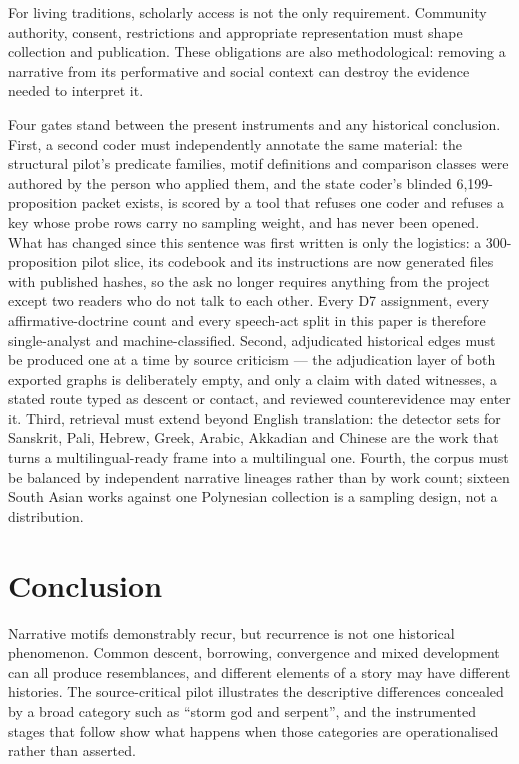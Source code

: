 \documentclass[11pt]{article}
\DeclareRobustCommand{\_}{\textunderscore\allowbreak}
\begin{document}
For living traditions, scholarly access is not the only requirement. Community
authority, consent, restrictions and appropriate representation must shape
collection and publication. These obligations are also methodological: removing a
narrative from its performative and social context can destroy the evidence needed
to interpret it.

Four gates stand between the present instruments and any historical conclusion.
First, a second coder must independently annotate the same material: the
structural pilot's predicate families, motif definitions and comparison classes
were authored by the person who applied them, and the state coder's blinded
6{,}199-proposition packet exists, is scored by a tool that refuses one coder and
refuses a key whose probe rows carry no sampling weight, and
has never been opened. What has changed since this sentence was first written is
only the logistics: a 300-proposition pilot slice, its codebook and its
instructions are now generated files with published hashes, so the ask no longer
requires anything from the project except two readers who do not talk to each
other. Every D7 assignment, every affirmative-doctrine count and
every speech-act split in this paper is therefore single-analyst and
machine-classified. Second, adjudicated historical edges must be produced one at a
time by source criticism --- the adjudication layer of both exported graphs is
deliberately empty, and only a claim with dated witnesses, a stated route typed as
descent or contact, and reviewed counterevidence may enter it. Third, retrieval
must extend beyond English translation: the detector sets for Sanskrit, Pali,
Hebrew, Greek, Arabic, Akkadian and Chinese are the work that turns a
multilingual-ready frame into a multilingual one. Fourth, the corpus must be
balanced by independent narrative lineages rather than by work count; sixteen
South Asian works against one Polynesian collection is a sampling design, not a
distribution.

\section{Conclusion}

Narrative motifs demonstrably recur, but recurrence is not one historical
phenomenon. Common descent, borrowing, convergence and mixed development can all
produce resemblances, and different elements of a story may have different
histories. The source-critical pilot illustrates the descriptive differences
concealed by a broad category such as ``storm god and serpent'', and the
instrumented stages that follow show what happens when those categories are
operationalised rather than asserted.
\end{document}
